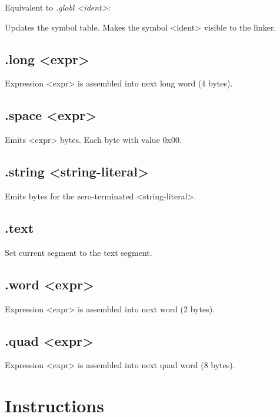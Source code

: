 \documentclass[
   a4paper,
   twoside,
   bringhurst,
   palatino,
   english,
   titlepage,
   fleqn
]{refman}
\begin{document}
    Equivalent to \textit{.globl <ident>}:

    Updates the symbol table. Makes the symbol <ident> visible to the linker.

    \section{.long <expr>}

    Expression <expr> is assembled into next long word (4 bytes).

    \section{.space <expr>}

    Emits <expr> bytes. Each byte with value 0x00.

    \section{.string <string-literal>}

    Emits bytes for the zero-terminated <string-literal>.

    \section{.text}

    Set current segment to the text segment.

    \section{.word <expr>}

    Expression <expr> is assembled into next word (2 bytes).

    \section{.quad <expr> }

    Expression <expr> is assembled into next quad word (8 bytes).


    \chapter{Instructions}

   \printindex
   \nocite{*}
   
\end{document}
